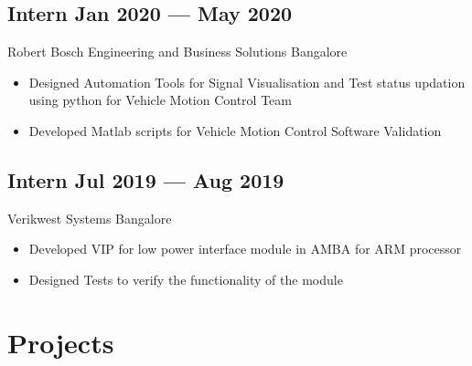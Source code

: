 \documentclass[a4,10pt]{article}
\newcommand{\subtext}[1]{
#1\par\vspace{-0.2cm}}
\newenvironment{zitemize}{
\begin{itemize}\itemsep0pt \parskip0pt \parsep1pt}
{\end{itemize}\vspace{-0.5cm}}
\begin{document}
\subsection*{Intern \hfill Jan 2020 --- May 2020} 
\subtext{Robert Bosch Engineering and Business Solutions \hfill Bangalore} 
    \begin{zitemize}
        \item Designed Automation Tools for Signal Visualisation and Test status updation using python for Vehicle Motion Control Team 
        \item Developed Matlab scripts for Vehicle Motion Control Software Validation 
    \end{zitemize}
    
\subsection*{Intern \hfill Jul 2019 --- Aug 2019} 
\subtext{Verikwest Systems  \hfill Bangalore} 
    \begin{zitemize}
        \item Developed VIP for low power interface module in AMBA for ARM processor
        \item Designed Tests to verify the functionality of the module
        
    \end{zitemize}




\section{Projects} %

\end{document}
